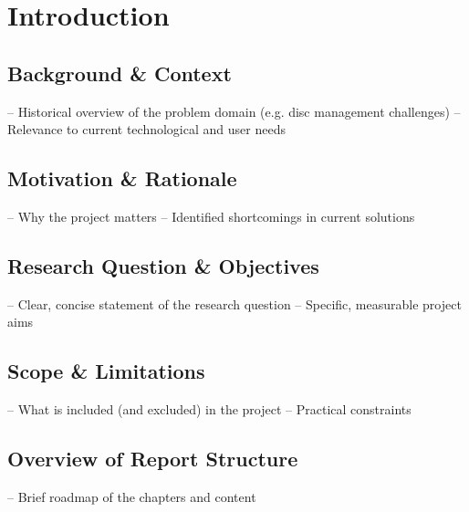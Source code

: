 \section{Introduction}

\subsection{Background \& Context}
– Historical overview of the problem domain (e.g. disc management challenges)
– Relevance to current technological and user needs
\subsection{Motivation \& Rationale}
– Why the project matters
– Identified shortcomings in current solutions
\subsection{Research Question \& Objectives}
– Clear, concise statement of the research question
– Specific, measurable project aims
\subsection{Scope \& Limitations}
– What is included (and excluded) in the project
– Practical constraints
\subsection{Overview of Report Structure}
– Brief roadmap of the chapters and content